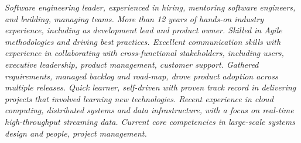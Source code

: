 {\selectfont
	\begin{justify}\textit{Software engineering leader, experienced in hiring, mentoring software engineers, and building, managing teams. More than 12 years of hands-on industry experience, including as development lead and product owner. Skilled in Agile methodologies and driving best practices. Excellent communication skills with experience in collaborating with cross-functional stakeholders, including users, executive leadership, product management, customer support. Gathered requirements, managed backlog and road-map, drove product adoption across multiple releases. Quick learner, self-driven with proven track record in delivering projects that involved learning new technologies. Recent experience in cloud computing, distributed systems and data infrastructure, with a focus on real-time high-throughput streaming data. Current core competencies in large-scale systems design and people, project management.}\end{justify}
}